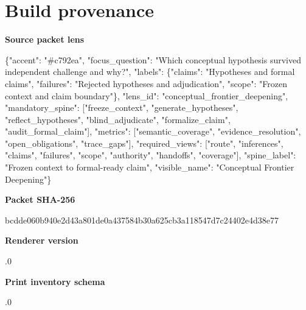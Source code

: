\documentclass[10pt,a4paper]{article}
\newcommand{\TraceField}[2]{\par\noindent\textbf{#1}\par\noindent #2\par\smallskip}
\begin{document}
\section{Build provenance}\label{app-provenance}
\TraceField{Source packet lens}{\{"accent":\allowbreak{} "\#c792ea",\allowbreak{} "focus\_\allowbreak{}question":\allowbreak{} "Which conceptual\allowbreak{} hypothesis\allowbreak{} survived independen\allowbreak{}t challenge and why?", "labels":\allowbreak{} \{"claims":\allowbreak{} "Hypothese\allowbreak{}s and formal claims", "failures"\allowbreak{}:\allowbreak{} "Rejected hypotheses\allowbreak{} and adjudicati\allowbreak{}on", "scope":\allowbreak{} "Frozen context and claim boundary"\}\allowbreak{}, "lens\_\allowbreak{}id":\allowbreak{} "conceptua\allowbreak{}l\_\allowbreak{}frontier\_\allowbreak{}deepening"\allowbreak{}, "mandatory\allowbreak{}\_\allowbreak{}spine":\allowbreak{} ["freeze\_\allowbreak{}context", "generate\_\allowbreak{}hypotheses\allowbreak{}", "reflect\_\allowbreak{}hypotheses\allowbreak{}", "blind\_\allowbreak{}adjudicate\allowbreak{}", "formalize\allowbreak{}\_\allowbreak{}claim", "audit\_\allowbreak{}formal\_\allowbreak{}claim"], "metrics":\allowbreak{} ["semantic\allowbreak{}\_\allowbreak{}coverage",\allowbreak{} "evidence\_\allowbreak{}resolution\allowbreak{}", "open\_\allowbreak{}obligation\allowbreak{}s", "trace\_\allowbreak{}gaps"], "required\_\allowbreak{}views":\allowbreak{} ["route", "inference\allowbreak{}s", "claims", "failures"\allowbreak{}, "scope", "authority\allowbreak{}", "handoffs"\allowbreak{}, "coverage"\allowbreak{}], "spine\_\allowbreak{}label":\allowbreak{} "Frozen context to formal-\allowbreak{}ready claim", "visible\_\allowbreak{}name":\allowbreak{} "Conceptua\allowbreak{}l Frontier Deepening"\allowbreak{}\}}
\TraceField{Packet SHA-256}{bcdde060b9\allowbreak{}40e2d43a80\allowbreak{}1de0a43758\allowbreak{}4b30a625cb\allowbreak{}3a118547d7\allowbreak{}c24402e4d3\allowbreak{}8e77}
\TraceField{Renderer version}{1.\allowbreak{}0}
\TraceField{Print inventory schema}{1.\allowbreak{}0}
\end{document}
